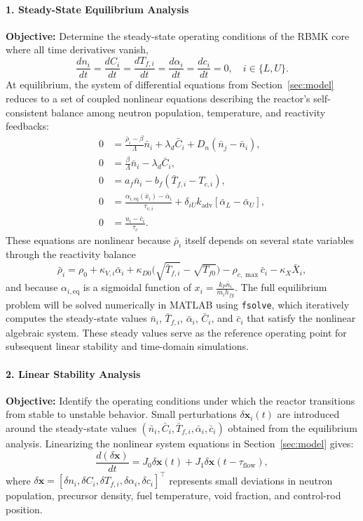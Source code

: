 \documentclass[11pt]{article}
\begin{document}
\paragraph{1. Steady-State Equilibrium Analysis}
\textbf{Objective:} Determine the steady-state operating conditions of the RBMK core where all time derivatives vanish,
\[
\frac{dn_i}{dt} = \frac{dC_i}{dt} = \frac{dT_{f,i}}{dt} = \frac{d\alpha_i}{dt} = \frac{dc_i}{dt} = 0, \quad i \in \{L, U\}.
\]
At equilibrium, the system of differential equations from Section~\ref{sec:model} reduces to a set of coupled nonlinear equations describing the reactor’s self-consistent balance among neutron population, temperature, and reactivity feedbacks:
\begin{align*}
    0 &= \frac{\bar{\rho}_i - \beta}{\Lambda} \bar{n}_i + \lambda_d \bar{C}_i + D_n(\bar{n}_j - \bar{n}_i), \\
    0 &= \frac{\beta}{\Lambda} \bar{n}_i - \lambda_d \bar{C}_i, \\
    0 &= a_f \bar{n}_i - b_f(\bar{T}_{f,i} - T_{c,i}), \\
    0 &= \frac{\alpha_{i,\mathrm{eq}}(\bar{x}_i) - \bar{\alpha}_i}{\tau_{v,i}} + \delta_{iU} k_{\mathrm{adv}}[\bar{\alpha}_L - \bar{\alpha}_U], \\
    0 &= \frac{u_i - \bar{c}_i}{\tau_c}.
\end{align*}
These equations are nonlinear because $\bar{\rho}_i$ itself depends on several state variables through the reactivity balance
\[
\bar{\rho}_i = \rho_0 + \kappa_{V,i} \bar{\alpha}_i + \kappa_{D0}\big(\sqrt{\bar{T}_{f,i}} - \sqrt{T_{f0}}\big) - \rho_{c,\max} \bar{c}_i - \kappa_X \bar{X}_i,
\]
and because $\alpha_{i,\mathrm{eq}}$ is a sigmoidal function of $x_i = \frac{k_P \bar{n}_i}{\dot{m}_i h_{fg}}$. The full equilibrium problem will be solved numerically in MATLAB using \texttt{fsolve}, which iteratively computes the steady-state values $\bar{n}_i$, $\bar{T}_{f,i}$, $\bar{\alpha}_i$, $\bar{C}_i$, and $\bar{c}_i$ that satisfy the nonlinear algebraic system. These steady values serve as the reference operating point for subsequent linear stability and time-domain simulations.

\paragraph{2. Linear Stability Analysis}
\textbf{Objective:} Identify the operating conditions under which the reactor transitions from stable to unstable behavior. Small perturbations $\delta \mathbf{x}_i(t)$ are introduced around the steady-state values $(\bar{n}_i, \bar{C}_i, \bar{T}_{f,i}, \bar{\alpha}_i, \bar{c}_i)$ obtained from the equilibrium analysis. Linearizing the nonlinear system equations in Section~\ref{sec:model} gives:
\[
\frac{d(\delta\mathbf{x})}{dt} = J_0 \delta\mathbf{x}(t) + J_1 \delta\mathbf{x}(t - \tau_{\mathrm{flow}}),
\]
where $\delta\mathbf{x} = [\delta n_i, \delta C_i, \delta T_{f,i}, \delta \alpha_i, \delta c_i]^{\top}$ represents small deviations in neutron population, precursor density, fuel temperature, void fraction, and control-rod position.
\end{document}
